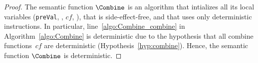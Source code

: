 \begin{proof}
	The semantic function $\Combine$ is an algorithm that 
	intializes all its local variables (\texttt{preVal}, \Thread{}, $cf$, \val{}), 
	that is side-effect-free, and that uses only deterministic instructions. 
	In particular, line~\ref{algo:Combine_combine} in Algorithm~\ref{algo:Combine} 
	is deterministic due to the hypothesis that all combine functions~$cf$ are 
	deterministic (Hypothesis~\ref{hyp:combine}).
	Hence, the semantic function $\Combine$ is deterministic.
\end{proof}

